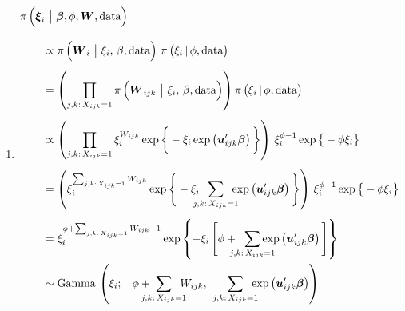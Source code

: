 \documentclass[11pt]{article}
\renewcommand{\vec}{\boldsymbol}
\newcommand{\barS}{\,|\,}
\newcommand{\barM}{~\big|~}
\begin{document}
\begin{enumerate}[label=Step \arabic*., leftmargin=13mm, itemsep=10mm]

\item 
\begin{align*} \MoveEqLeft
\pi\, \Big( \vec{\xi}_i \barM \vec{\beta}, \phi, \vec{W}, \text{data} \Big) \\[2ex]
&\propto \pi\,\Big( \vec{W}_i \barM \xi_i,\, \beta, \text{data} \Big)~ \pi\, \big( \xi_i \barS \phi, \text{data} \big) \\[1ex]
&= \left( \prod_{j,k{:}\, X_{ijk}=1} \pi\,\Big( \vec{W}_{ijk} \barM \xi_i,\, \beta, \text{data} \Big) \right) \pi\, \big( \xi_i \barS \phi, \text{data} \big) \\[1ex]
&\propto \left( \prod_{j,k{:}\, X_{ijk}=1} \xi_i^{W_{ijk}} \exp\bigg\{ -\xi_i \exp\left( \vec{u}_{ijk}^\prime \vec{\beta} \right) \bigg\} \right)\, \xi_i^{\phi - 1} \exp\big\{ -\phi \xi_i \big\} \\[1ex]
&= \left( \xi_i^{\sum_{j,k{:}\, X_{ijk}=1} W_{ijk}} \exp\Bigg\{ -\xi_i \hspace{2mm} \sum_{\mathclap{ j,k{:}\, X_{ijk}=1 }} \hspace{2mm} \exp\left( \vec{u}_{ijk}^\prime \vec{\beta} \right) \Bigg\} \right)\, \xi_i^{\phi - 1} \exp\big\{ -\phi \xi_i \big\} \\[1ex]
&= \xi_i^{ \phi + \sum_{j,k{:}\, X_{ijk}=1} W_{ijk} - 1 } \exp\left\{ -\xi_i\, \Bigg[ \phi + \hspace{2mm} \sum_{\mathclap{ j,k{:}\, X_{ijk}=1 }} \exp\left( \vec{u}_{ijk}^\prime \vec{\beta} \right) \Bigg] \right\} \\
& \sim \text{Gamma}\,\left(\xi_i; \hspace{3mm} \phi + \hspace{1mm} \sum_{\mathclap{ j,k{:}\, X_{ijk}=1 }} \hspace{2mm} W_{ijk}, \hspace{6mm} \sum_{\mathclap{ j,k{:}\, X_{ijk}=1 }}\hspace{2mm} \exp\left( \vec{u}_{ijk}^\prime \vec{\beta} \right) \right)
\end{align*}







\end{enumerate}
\end{document}
